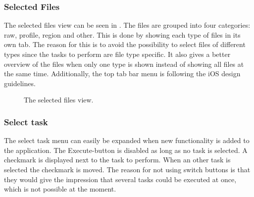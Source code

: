 \subsubsection{Selected Files}
The selected files view can be seen in . The files are grouped into four categories: raw, profile, region and other. This is done by showing each type of files in its own tab. The reason for this is to avoid the possibility to select files of different types since the tasks to perform are file type specific. It also gives a better overview of the files when only one type is shown instead of showing all files at the same time. Additionally, the top tab bar menu is following the iOS design guidelines.

\begin{figure}[ht]
\caption{The selected files view.}
\label{fig:ios_selectedFiles2}
\end{figure}
\FloatBarrier

\subsubsection{Select task}
The select task menu can easily be expanded when new functionality is added to the application. The Execute-button is disabled as long as no task is selected. A checkmark is displayed next to the task to perform. When an other task is selected the checkmark is moved. The reason for not using switch buttons is that they would give the impression that several tasks could be executed at once, which is not possible at the moment.
